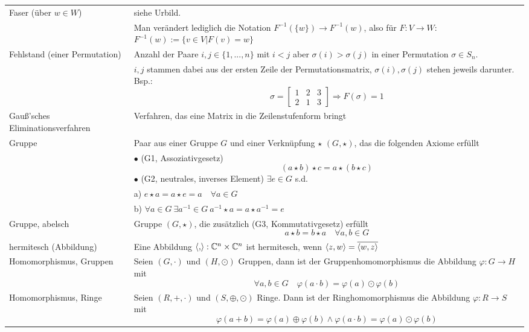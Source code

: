 \documentclass{article}
\begin{document}
\begin{xltabular}{\linewidth}{p{0.33\textwidth}|X}
	\hline
		Faser (über $w\in W$) & siehe Urbild.\\
		& \textcolor{gruen}{Man verändert lediglich die Notation $F^{-1}(\{w\}) \to F^{-1}(w)$, also für $F:V\to W$:} $F^{-1}(w) := \{v\in V | F(v) = w\}$ \\
	\hline
		Fehlstand (einer Permutation) & Anzahl der Paare $i,j\in\{1,...,n\}$ mit $i<j$ aber $\sigma(i) > \sigma(j)$ in einer Permutation $\sigma\in S_n$.\\
		& \textcolor{gruen}{$i,j$ stammen dabei aus der ersten Zeile der Permutationsmatrix, $\sigma(i),\sigma(j)$ stehen jeweils darunter. Bsp.:}
			$$\sigma = 
			\begin{bmatrix}
				1 & 2 & 3 \\
				2 & 1 & 3
			\end{bmatrix}
			\Rightarrow F(\sigma) = 1$$\\
	\hline
		Gauß'sches Eliminationsverfahren & Verfahren, das eine Matrix in die Zeilenstufenform bringt \\
	\hline
		Gruppe & Paar aus einer Gruppe $G$ und einer Verknüpfung $\star$ $(G,\star)$, das die folgenden Axiome erfüllt\\
		& $\bullet$ \textcolor{gruen}{(G1, Assoziativgesetz)}
			$$(a\star b) \star c = a\star (b\star c)$$
		$\bullet$ \textcolor{gruen}{(G2, neutrales, inverses Element)} $\exists e\in G$ s.d.\\
		& \qquad a) $e\star a = a\star e = a\quad \forall a\in G$\\
		& \qquad b) $\forall a\in G\ \exists a^{-1}\in G\ a^{-1}\star a = a\star a^{-1} = e$\\
	\hline
		Gruppe, abelsch & Gruppe $(G,\star)$, die zusätzlich \textcolor{gruen}{(G3, Kommutativgesetz)} erfüllt
			$$a\star b = b\star a\quad \forall a,b\in G$$ \\
	\hline
		hermitesch (Abbildung) & Eine Abbildung $\braket{,}:\mathbb{C}^n\times\mathbb{C}^n$ ist hermitesch, wenn $\braket{z,w} = \overline{\braket{w,z}}$ \\
	\hline
		Homomorphismus, Gruppen & Seien $(G,\cdot)$ und $(H,\odot)$ Gruppen, dann ist der Gruppenhomomorphismus die Abbildung $\varphi:G\rightarrow H$ mit
			$$\forall a,b\in G\quad \varphi(a \cdot b) = \varphi(a) \odot \varphi(b)$$ \\
	\hline
		Homomorphismus, Ringe & Seien $(R,+,\cdot)$ und $(S,\oplus,\odot)$ Ringe. Dann ist der Ringhomomorphismus die Abbildung $\varphi: R\rightarrow S$ mit
			$$\varphi(a+b) = \varphi(a) \oplus \varphi(b) \wedge \varphi(a\cdot b) = \varphi(a) \odot \varphi(b)$$ \\

\end{xltabular}
\end{document}
